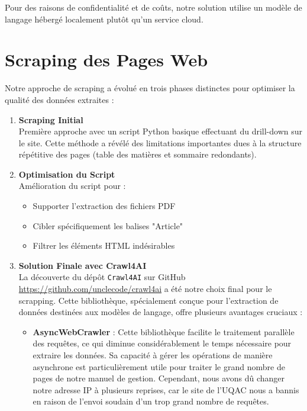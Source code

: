 \documentclass{article}
\begin{document}
Pour des raisons de confidentialité et de coûts, notre solution utilise un modèle de langage hébergé localement plutôt qu'un service cloud.


\clearpage

\section{Scraping des Pages Web}

Notre approche de scraping a évolué en trois phases distinctes pour optimiser la qualité des données extraites :

\begin{enumerate}
    \item \textbf{Scraping Initial} \\
    Première approche avec un script Python basique effectuant du drill-down sur le site. Cette méthode a révélé des limitations importantes dues à la structure répétitive des pages (table des matières et sommaire redondants).

    \item \textbf{Optimisation du Script} \\
    Amélioration du script pour :
    \begin{itemize}
        \item Supporter l'extraction des fichiers PDF
        \item Cibler spécifiquement les balises "Article"
        \item Filtrer les éléments HTML indésirables
    \end{itemize}
    
    \item \textbf{Solution Finale avec Crawl4AI} \\

La découverte du dépôt \texttt{Crawl4AI} sur GitHub \href{https://github.com/unclecode/crawl4ai}{https://github.com/unclecode/crawl4ai} a été notre choix final pour le scrapping. Cette bibliothèque, spécialement conçue pour l'extraction de données destinées aux modèles de langage, offre plusieurs avantages cruciaux :

\begin{itemize}
    \item \textbf{AsyncWebCrawler} : Cette bibliothèque facilite le traitement parallèle des requêtes, ce qui diminue considérablement le temps nécessaire pour extraire les données. Sa capacité à gérer les opérations de manière asynchrone est particulièrement utile pour traiter le grand nombre de pages de notre manuel de gestion. Cependant, nous avons dû changer notre adresse IP à plusieurs reprises, car le site de l'UQAC nous a bannis en raison de l'envoi soudain d'un trop grand nombre de requêtes.
    

\end{itemize}
\end{enumerate}
\end{document}
